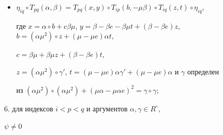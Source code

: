 \begin{itemize}
$(\alpha\mu^2)\circ(\alpha\mu^2)+(\mu\beta)^2=\gamma\circ\gamma$; 


\item[d)] $\eta_{iq}\circ T_{pq}(\alpha,\beta)=T_{pq}(x,y)\circ 


T_{ip}(b,-\mu\beta)\circ T_{iq}(z,t)\circ\eta_{iq}$, 


где $x=\alpha\circ b+c\beta\mu$, $y=\beta-\beta e-\beta\mu 


t+(\beta-\beta e)z$, $b=(\alpha\mu^2)\circ z+(\mu-\mu e)\alpha t$, 


$c=\beta\mu+\beta\mu z+(\beta-\beta e)t$, 


$z=(\alpha\mu^2)\circ\gamma'$, $t=(\mu-\mu e)\alpha\gamma'+(\mu-\mu 


e)\alpha$ и $\gamma$ определен 


из $(\alpha\mu^2)\circ(\alpha\mu^2)+(\mu\alpha-\mu\alpha 


e)^2=\gamma\circ\gamma$; 


\end{itemize} 


 


6. для индексов $i<p<q$ и аргументов $\alpha,\gamma\in R^\circ$, 


$\psi\ne0$ 


